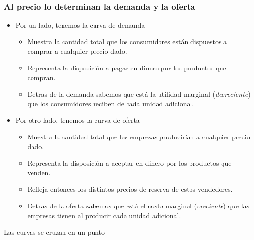 \documentclass{beamer}
\begin{document}
\begin{frame}
\frametitle{Al precio lo determinan la demanda y la oferta}
\begin{itemize}
    \item Por un lado, tenemos la curva de demanda
    \begin{itemize}
        \item Muestra la cantidad total que los consumidores están dispuestos a comprar a cualquier precio dado.
        \item Representa la disposición a pagar en dinero por los productos que compran.
        \item Detras de la demanda sabemos que está la utilidad marginal (\textit{decreciente}) que los consumidores reciben de cada unidad adicional.
    \end{itemize}
    \item Por otro lado, tenemos la curva de oferta
    \begin{itemize}
        \item Muestra la cantidad total que las empresas producirían a cualquier precio dado.
        \item Representa la disposición a aceptar en dinero por los productos que venden.
        \item Refleja entonces los distintos precios de reserva de estos vendedores.
        \item Detras de la oferta sabemos que está el costo marginal (\textit{creciente}) que las empresas tienen al producir cada unidad adicional.
        \end{itemize}
\end{itemize}
\end{frame}


\begin{frame}{Las curvas se cruzan en un punto}
        \begin{figure}[H]
        \begin{center}
        \end{center}
        \end{figure}
    \end{frame}
\end{document}

